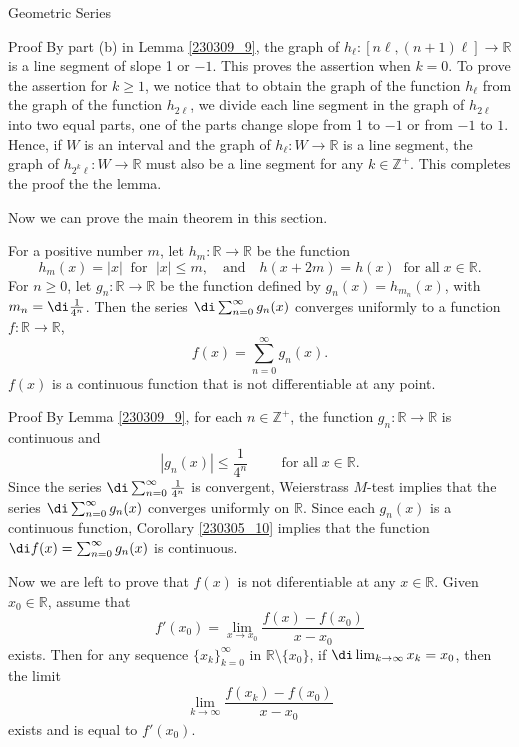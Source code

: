 \begin{example}[label=230305_16]{Geometric Series}
\begin{example}[label=230304_9]{}
\begin{example}{}
\begin{example}{}
\begin{myproof}{Proof}
 By part (b) in Lemma \ref{230309_9}, the graph of $h_{\ell}:[n\ell, (n+1)\ell]\to\mathbb{R}$ is a line segment of slope 1 or $-1$. This proves the assertion when $k=0$. To prove the assertion for $k\geq 1$, we notice that to obtain the graph of the function $h_{\ell}$ from the graph of the function $h_{2\ell}$, we divide each line segment in the graph of $h_{2\ell}$ into two equal parts, one of the parts change slope from 1 to $-1$ or from $-1$ to $1$. Hence, if $W$ is an interval and the graph of $h_{\ell}:W\to\mathbb{R}$ is a line segment, the graph of $h_{2^k\ell}:W\to\mathbb{R}$ must also be a line segment for any $k\in\mathbb{Z}^+$. This completes the proof the the lemma.
\end{myproof}

Now we can prove the main theorem in this section.

\begin{theorem}
{}For a positive number $m$, let $h_m:\mathbb{R}\to\mathbb{R}$ be the function
\[h_m(x)=|x|\;\;\text{for }\;|x|\leq m, \quad \text{and}\quad h(x+2m)=h(x)\;\;\text{for all}\;x\in\mathbb{R}.\]For $n\geq 0$, let $g_n:\mathbb{R}\to\mathbb{R}$ be the function defined by
$g_n(x)=h_{m_n}(x)$, with $m_n=\di\frac{1}{4^n}$. 
Then the series $\di \sum_{n=0}^{\infty}g_n(x)$ converges uniformly to a function  $f:\mathbb{R}\to\mathbb{R}$,  \[ f(x)=\sum_{n=0}^{\infty}g_n(x).\] $f(x)$ is  a continuous function that is not differentiable at any point.
\end{theorem}
\begin{myproof}{Proof}
 By Lemma \ref{230309_9}, for each $n\in\mathbb{Z}^+$, the function $g_n:\mathbb{R}\to\mathbb{R}$ is continuous and 
\[|g_n(x)|\leq\frac{1}{4^n}\hspace{1cm}\text{for all}\;x\in\mathbb{R}.\]   Since the series $\di\sum_{n=0}^{\infty}\frac{1}{4^n}$ is convergent,
  Weierstrass $M$-test implies that the series $\di \sum_{n=0}^{\infty}g_n(x)$ converges uniformly on $\mathbb{R}$.  Since each $g_n(x)$ is a continuous function,   Corollary \ref{230305_10} implies that  the function  
$\di f(x)=\sum_{n=0}^{\infty}g_n(x)$ is continuous.


 Now we are left to prove that $f(x)$ is not diferentiable at any $x\in \mathbb{R}$. Given $x_0\in \mathbb{R}$, assume that 
\[f'(x_0)=\lim_{x\to x_0}\frac{f(x)-f(x_0)}{x-x_0}\] exists. Then for any sequence $\{x_k\}_{k=0}^{\infty}$ in $\mathbb{R}\setminus\{x_0\}$,  if $\di \lim_{k\to\infty}x_k=x_0$, then the limit  
\[\lim_{k\to \infty}\frac{f(x_k)-f(x_0)}{x-x_0}\]exists and is equal to $f'(x_0)$.\bp


\end{myproof}
\end{example}
\end{example}
\end{example}
\end{example}
